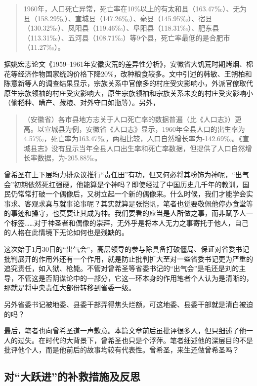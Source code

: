 \begin{quotation}
  1960年，人口死亡异常，死亡率在10\%以上的有太和县（163.47‰）、无为县（158.29‰）、宣城县（147.26‰）、毫县（145.95‰）、宿县（130.32‰）、凤阳县（119.46‰）、阜阳县（118.31‰）、肥东县（113.31‰）、五河县（108.71‰）等9个县，死亡率最低的是合肥市（11.27‰）。
\end{quotation}

据姚宏志论文《1959--1961年安徽灾荒的差异性分析》，安徽省大饥荒时期烤烟、棉花等经济作物国家统购价格下降20\%，改种粮食较多。文中引述的韩敏、王朔柏和陈意新等人的调查结果显示，宗族关系中官僚多的村庄受灾影响小，外派官僚取代原生宗族领袖的村庄受灾影响大，原生宗族领袖和宗族关系未变的村庄受灾影响小（偷稻种、瞒产、藏粮、对外守口如瓶等）。另外，
\begin{quotation}（安徽省）各市县地方志关于人口死亡率的数据普遍（比《人口志》）更高。以宣城县为例，安徽省《人口志》显示，1960年全县人口的出生率为4.57‰，死亡率为163.47‰，两相比较，人口自然增长率为-142.69‰。《宣城县志》没有显示当年全县人口出生率和死亡率数据，但提供了人口自然增长率数据，为-205.88‰。\cite{zaihuangchayixing}
\end{quotation}

曾希圣在上下层均力排众议推行“责任田”有功，但又何必将其粉饰为神呢，“出气会”初期依然死扛强硬，他能算是个神吗？即使经过了中国历史几千年的教训，国民仍常常打破一个偶像后，又树立起一个新的偶像来。什么时候，我们才能学会实事求、客观求真与就事论事呢？其实就算是张恺帆，笔者也觉要敬佩他停办食堂等的事迹和操守，也莫要让其成为神。我们要看的应当是人所做之事，而非赋予人一个标签……对于神圣者和偶像的崇拜，无外乎是将本人无力之事寄托于他人，自己的人格在此情境下无论如何也是残缺的。

这次始于1月30日的“出气会”，高层领导的参与除具备打破僵局、保证对省委书记批判展开的作用外还有一个作用，就是防止批判扩大至对一些省委书记更为严重的追究责任，如入狱、枪毙。不管对曾希圣等省委书记的“出气会”是毛还是刘的主导，不管这是否阴谋论中的一部分，它这一环本身的作用笔者个人认为是清晰的，那就是将中央责任大部份转移到省委一级。

另外省委书记被地委、县委干部弄得焦头烂额，可这地委、县委干部就是清白被迫的吗？

最后，笔者也向曾希圣道一声歉意。本篇文章前后虽批评很多人，但只细述了他一人的过失。在时代的大背景下，曾希圣也只是个浮萍。笔者细述他的深层目的不是批评他个人，而是他前后的故事均较有代表性。曾希圣，来生还做曾希圣吗？

\subsection{对“大跃进”的补救措施及反思}

